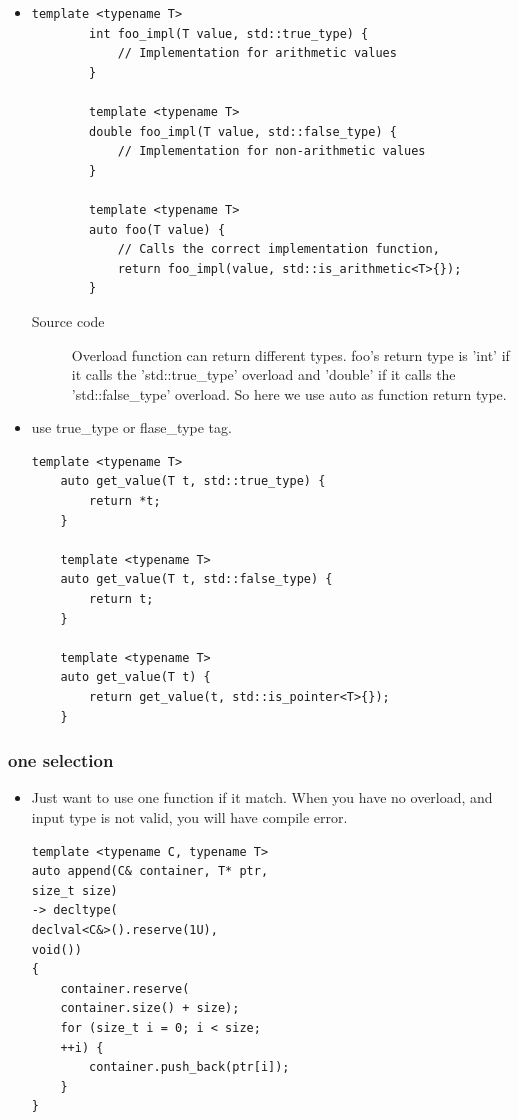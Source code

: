 \documentclass[a4paper,11pt,twoside]{book}
\begin{document}
\begin{itemize}
	\item \begin{lstlisting}[numbers=none]
		template <typename T>
		int foo_impl(T value, std::true_type) {
			// Implementation for arithmetic values
		}
		
		template <typename T>
		double foo_impl(T value, std::false_type) {
			// Implementation for non-arithmetic values
		}
		
		template <typename T>
		auto foo(T value) {
			// Calls the correct implementation function, 
			return foo_impl(value, std::is_arithmetic<T>{});
		}
	\end{lstlisting}
\begin{description}
	\item[Source code] Overload function can return different types. foo's return type is 'int' if it calls the 'std::true\_type' overload and 'double' if it calls the 'std::false\_type' overload. So here we use auto as function return type.
\end{description}
	
	
	\item use true\_type or flase\_type tag.
\begin{lstlisting}[numbers=none]
	template <typename T>
	auto get_value(T t, std::true_type) {
		return *t;
	}
	
	template <typename T>
	auto get_value(T t, std::false_type) {
		return t;
	}
	
	template <typename T>
	auto get_value(T t) {
		return get_value(t, std::is_pointer<T>{}); 
	}
\end{lstlisting}	
\end{itemize}

	

\subsubsection{one selection}

\begin{itemize}
	\item Just want to use one function if it match.  When you have no overload, and input type is not valid, you will have compile error. 

\begin{lstlisting}[numbers=none]
template <typename C, typename T>
auto append(C& container, T* ptr,
size_t size)
-> decltype(
declval<C&>().reserve(1U),
void())
{
	container.reserve(
	container.size() + size);
	for (size_t i = 0; i < size;
	++i) {
		container.push_back(ptr[i]);
	}
}
\end{lstlisting}	

\end{itemize}
\end{document}

